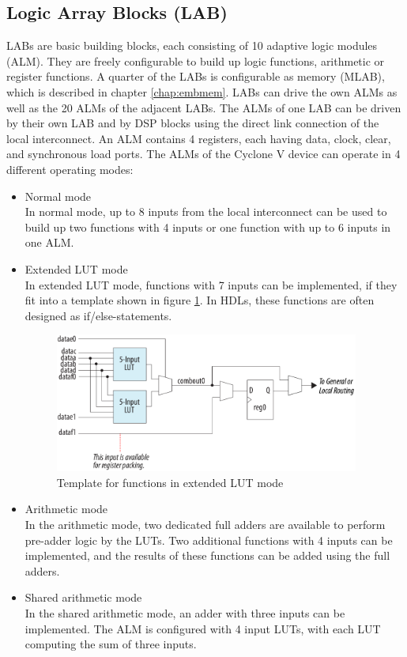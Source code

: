 \subsection{Logic Array Blocks (LAB)}
LABs are basic building blocks, each consisting of 10 adaptive logic modules (ALM). They are freely configurable to build up logic functions, arithmetic or register functions. A quarter of the LABs is configurable as memory (MLAB), which is described in chapter \ref{chap:embmem}. LABs can drive the own ALMs as well as the 20 ALMs of the adjacent LABs. The ALMs of one LAB can be driven by their own LAB and by DSP blocks using the direct link connection of the local interconnect. An ALM contains 4 registers, each having data, clock, clear, and synchronous load ports. The ALMs of the Cyclone V device can operate in 4 different operating modes\cite[chapter 1]{AlteraFPGA15}:
\begin{itemize}
\item Normal mode\\
In normal mode, up to 8 inputs from the local interconnect can be used to build up two functions with 4 inputs or one function with up to 6 inputs in one ALM. 
\item Extended LUT mode\\
In extended LUT mode, functions with 7 inputs can be implemented, if they fit into a template shown in figure \ref{fig:extendedlutfigure}. In HDLs, these functions are often designed as if/else-statements.
\begin{figure}[htbp]
\begin{center}
\includegraphics[width=10cm,keepaspectratio=true]{bilder/png/extendedlutfigure}
\caption{Template for functions in extended LUT mode\cite[chapter 1]{AlteraFPGA15}}
\label{fig:extendedlutfigure}
\end{center}
\end{figure}
\item Arithmetic mode\\
In the arithmetic mode, two dedicated full adders are available to perform pre-adder logic by the LUTs. Two additional functions with 4 inputs can be implemented, and the results of these functions can be added using the full adders.
\item Shared arithmetic mode\\
In the shared arithmetic mode, an adder with three inputs can be implemented. The ALM is configured with 4 input LUTs, with each LUT computing the sum of three inputs.
\end{itemize}
